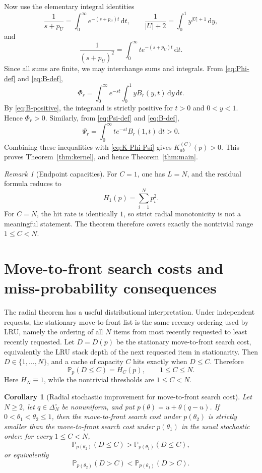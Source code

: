 \documentclass[11pt]{article}
\newtheorem{corollary}[theorem]{Corollary}
\theoremstyle{remark}
\newtheorem{remark}[theorem]{Remark}
\newcommand{\dd}{\,\mathrm{d}}
\newcommand{\Pp}{\mathbb{P}}
\newcommand{\card}[1]{\lvert #1\rvert}
\begin{document}
Now use the elementary integral identities
\[
        \frac{1}{s+p_U}
        =\int_0^\infty e^{-(s+p_U)t}\dd t,
        \qquad
        \frac{1}{\card U+2}
        =\int_0^1 y^{\card U+1}\dd y,
\]
and
\[
        \frac{1}{(s+p_U)^2}
        =\int_0^\infty t e^{-(s+p_U)t}\dd t.
\]
Since all sums are finite, we may interchange sums and integrals.  From
\eqref{eq:Phi-def} and \eqref{eq:B-def},
\[
        \Phi_r
        =
        \int_0^\infty e^{-st}
        \int_0^1 y B_r(y,t)\dd y\dd t.
\]
By \eqref{eq:B-positive}, the integrand is strictly positive for
$t>0$ and $0<y<1$.  Hence $\Phi_r>0$.  Similarly, from
\eqref{eq:Psi-def} and \eqref{eq:B-def},
\[
        \Psi_r
        =
        \int_0^\infty t e^{-st}B_r(1,t)\dd t>0.
\]
Combining these inequalities with \eqref{eq:K-Phi-Psi} gives
$K_{ab}^{(C)}(p)>0$.  This proves Theorem~\ref{thm:kernel}, and hence
Theorem~\ref{thm:main}.

\begin{remark}[Endpoint capacities]
For $C=1$, one has $L=N$, and the residual formula reduces to
\[
        H_1(p)=\sum_{i=1}^N p_i^2.
\]
For $C=N$, the hit rate is identically $1$, so strict radial monotonicity
is not a meaningful statement.  The theorem therefore covers exactly the
nontrivial range $1\le C<N$.
\end{remark}

\section{Move-to-front search costs and miss-probability consequences}\label{sec:stack-depth}

The radial theorem has a useful distributional interpretation.  Under
independent requests, the stationary move-to-front list is the same
recency ordering used by LRU, namely the ordering of all $N$ items from
most recently requested to least recently requested.  Let $D=D(p)$ be the
stationary move-to-front search cost, equivalently the LRU stack depth of
the next requested item in stationarity.  Then $D\in\{1,\ldots,N\}$, and a
cache of capacity $C$ hits exactly when $D\le C$.  Therefore
\begin{equation}\label{eq:stack-depth-cdf}
        \Pp_p(D\le C)=H_C(p),
        \qquad 1\le C\le N.
\end{equation}
Here $H_N\equiv1$, while the nontrivial thresholds are
$1\le C<N$.

\begin{corollary}[Radial stochastic improvement for move-to-front search cost]\label{cor:stack-depth}
Let $N\ge2$, let $q\in\Delta_N^\circ$ be nonuniform, and put
$p(\theta)=u+\theta(q-u)$.  If $0<\theta_1<\theta_2\le1$, then the
move-to-front search cost under $p(\theta_2)$ is strictly smaller than the
move-to-front search cost under $p(\theta_1)$ in the usual stochastic
order: for every $1\le C<N$,
\[
        \Pp_{p(\theta_2)}(D\le C)
        >
        \Pp_{p(\theta_1)}(D\le C),
\]
or equivalently
\[
        \Pp_{p(\theta_2)}(D>C)
        <
        \Pp_{p(\theta_1)}(D>C).
\]
\end{corollary}
\end{document}
